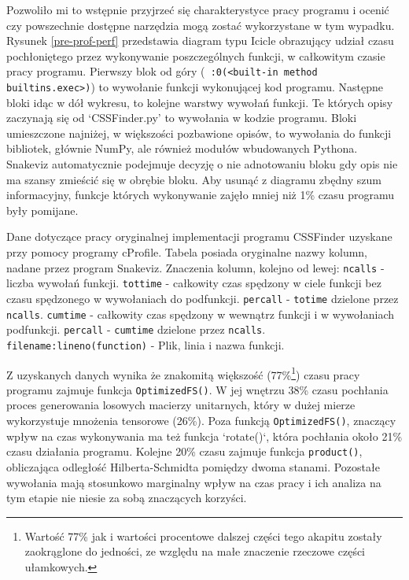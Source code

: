 \documentclass[11pt, a4paper]{article}
\newcommand{\code}[1]{\texttt{#1}}
\begin{document}
\begin{sloppypar}
    Pozwoliło mi to wstępnie przyjrzeć się charakterystyce pracy programu i ocenić czy powszechnie
    dostępne narzędzia mogą zostać wykorzystane w tym wypadku. Rysunek
    \ref{pre-prof-perf} przedstawia diagram typu Icicle obrazujący udział czasu
    pochłoniętego przez wykonywanie poszczególnych funkcji, w całkowitym czasie pracy programu.
    Pierwszy blok od góry (\code{~:0(<built-in method builtins.exec>)}) to wywołanie funkcji
    wykonującej kod programu. Następne bloki idąc w dół wykresu, to kolejne warstwy wywołań
    funkcji. Te których opisy zaczynają się od `CSSFinder.py' to wywołania w kodzie
    programu. Bloki umieszczone najniżej, w większości pozbawione opisów, to wywołania do
    funkcji bibliotek, głównie NumPy, ale również modułów wbudowanych Pythona. Snakeviz
    automatycznie podejmuje decyzję o nie adnotowaniu bloku gdy opis nie ma szansy
    zmieścić się w obrębie bloku. Aby usunąć z diagramu zbędny szum informacyjny,
    funkcje których wykonywanie zajęło mniej niż 1\% czasu programu były pomijane.

    \FloatBarrier
    \begin{table}[ht]
      \tiny
      \centering
      
      \caption{Dane dotyczące pracy oryginalnej implementacji programu CSSFinder uzyskane przy pomocy programy cProfile. Tabela posiada oryginalne nazwy kolumn, nadane przez program Snakeviz. Znaczenia kolumn, kolejno od lewej: \code{ncalls} - liczba wywołań funkcji. \code{tottime} - całkowity czas spędzony w ciele funkcji bez czasu spędzonego w wywołaniach do podfunkcji. \code{percall} - \code{totime} dzielone przez \code{ncalls}. \code{cumtime} - całkowity czas spędzony w wewnątrz funkcji i w wywołaniach podfunkcji. \code{percall} - \code{cumtime} dzielone przez \code{ncalls}. \code{filename:lineno(function)} - Plik, linia i nazwa funkcji.}
    \end{table}
    \FloatBarrier

    Z uzyskanych danych wynika że znakomitą większość (77\%\footnote{Wartość 77\% jak i
    wartości procentowe dalszej części tego akapitu zostały zaokrąglone do jedności, ze względu
    na małe znaczenie rzeczowe części ułamkowych.}) czasu pracy programu zajmuje funkcja
    \code{OptimizedFS()}. W jej wnętrzu 38\% czasu pochłania proces generowania losowych
    macierzy unitarnych, który w dużej mierze wykorzystuje mnożenia tensorowe (26\%).
    Poza funkcją \code{OptimizedFS()}, znaczący wpływ na czas wykonywania ma też funkcja
    `rotate()`, która pochłania około 21\% czasu działania programu. Kolejne 20\% czasu
    zajmuje funkcja \code{product()}, obliczająca odległość Hilberta-Schmidta pomiędzy
    dwoma stanami. Pozostałe wywołania mają stosunkowo marginalny wpływ na czas pracy i ich
    analiza na tym etapie nie niesie za sobą znaczących korzyści.


\end{sloppypar}
\end{document}
